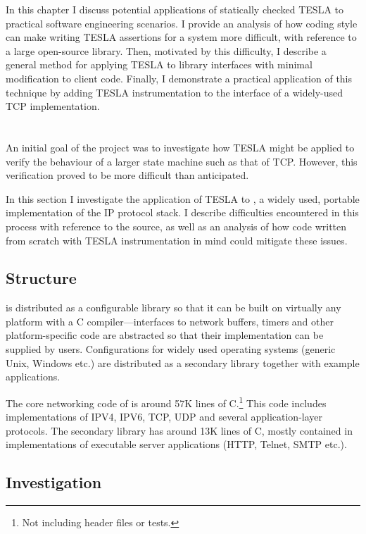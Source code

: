 In this chapter I discuss potential applications of statically checked TESLA to
practical software engineering scenarios. I provide an analysis of how coding
style can make writing TESLA assertions for a system more difficult, with
reference to a large open-source library. Then, motivated by this difficulty, I
describe a general method for applying TESLA to library interfaces with minimal
modification to client code. Finally, I demonstrate a practical application of
this technique by adding TESLA instrumentation to the interface of a widely-used
TCP implementation.

\section{\lwip{}} \label{sec:lwip}

An initial goal of the project was to investigate how TESLA might be
applied to verify the behaviour of a larger state machine such as that
of TCP. However, this verification proved to be more difficult than
anticipated.

In this section I investigate the application of TESLA to \lwip{}
\cite{dunkels_design_2001}, a widely used, portable implementation of
the IP protocol stack. I describe difficulties encountered in this
process with reference to the \lwip{} source, as well as an analysis of how
code written from scratch with TESLA instrumentation in mind could
mitigate these issues.

\subsection{Structure}

\lwip{} is distributed as a configurable library so that it can be built on
virtually any platform with a C compiler---interfaces to network
buffers, timers and other platform-specific code are abstracted so that
their implementation can be supplied by users. Configurations for
widely used operating systems (generic Unix, Windows etc.) are
distributed as a secondary library together with example applications.

The core networking code of \lwip{} is around 57K lines of C.\footnote{Not
including header files or tests.} This code includes implementations of IPV4,
IPV6, TCP, UDP and several application-layer protocols. The secondary library
has around 13K lines of C, mostly contained in implementations of executable
server applications (HTTP, Telnet, SMTP etc.).

\subsection{Investigation}

